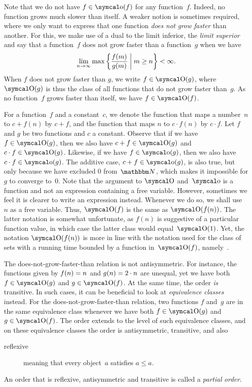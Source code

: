Note that we do not have $f \in \littleo(f)$ for any function~$f$.
Indeed, no function grows much slower than itself.
A weaker notion is sometimes required, where we only want to express that one function \emph{does not grow faster} than another.
For this, we make use of a dual to the limit inferior, the \emph{limit superior} and say that a function~$f$ does not grow faster than a function~$g$ when we have
\begin{equation*}
  \lim_{n \to \infty} \max \left\{\frac{f(m)}{g(m)} \st[\middle] m \ge n\right\} < \infty.
\end{equation*}
When $f$ does not grow faster than $g$, we write $f \in \bigO(g)$, where $\bigO(g)$ is thus the class of all functions that do not grow faster than~$g$.
As no function~$f$ grows faster than itself, we have $f \in \bigO(f)$.

For a function~$f$ and a constant~$c$, we denote the function that maps a number~$n$ to $c + f(n)$ by $c + f$, and the function that maps $n$ to $c \cdot f(n)$ by $c \cdot f$.
Let $f$ and $g$ be two functions and $c$ a constant.
Observe that if we have $f \in \bigO(g)$, then we also have $c + f \in \bigO(g)$ and $c \cdot f \in \bigO(g)$.
Likewise, if we have $f \in \littleo(g)$, then we also have $c \cdot f \in \littleo(g)$.
The additive case, $c + f \in \littleo(g)$, is also true, but only because we have excluded $0$ from~$\bbN$, which makes it impossible for $g$ to converge to~$0$.
Note that the argument to $\bigO$ and~$\littleo$ is a function and not an expression containing a free variable.
However, sometimes we feel it is clearer to write an expression instead.
Whenever we do so, we shall use~$n$ as a free variable.
Thus, $\bigO(f)$ is the same as $\bigO(f(n))$.
The latter notation is somewhat unfortunate, as $f(n)$ is suggestive of a particular function value, in which case the latter class would equal~$\bigO(1)$.
Yet, the notation $\bigO(f(n))$ is more in line with the notation used for the class of sets with a running time bounded by a function in~$\bigO(f)$, namely~.

The does-not-grow-faster-than relation is not antisymmetric.
For instance, the functions given by $f(n) \deq n$ and $g(n) \deq 2 \cdot n$ are unequal, yet we have both $f \in \bigO(g)$ and $g \in \bigO(f)$.
At the same time, the order \emph{is} transitive.
In such cases, it can be beneficial to look at \emph{equivalence classes} instead.
For the does-not-grow-faster-than relation, two functions $f$ and~$g$ are in the same equivalence class whenever we have both $f \in \bigO(g)$ and $g \in \bigO(f)$.
The order extends to the level of such equivalence classes, and on these equivalence classes the order is antisymmetric, transitive, and also
\begin{description}
\item[reflexive] meaning that every object~$a$ satisfies $a \le a$.
\end{description}
An order that is reflexive, antisymmetric and transitive is called a \emph{partial order}.

